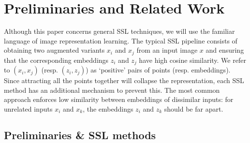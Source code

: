 
\section{Preliminaries and Related Work}


Although this paper concerns general SSL techniques, we will use the familiar language of image representation learning. The typical SSL pipeline consists of obtaining two augmented variants $x_i$ and $x_j$ from an input image $x$ and ensuring that the corresponding embeddings $z_i$ and $z_j$ have high cosine similarity. We refer to $(x_i, x_j)$ (resp. $(z_i, z_j)$) as `positive' pairs of points (resp. embeddings). 
Since attracting all the points together will collapse the representation, each SSL method has an additional mechanism to prevent this. The most common approach enforces low similarity between embeddings of dissimilar inputs: for unrelated inputs $x_i$ and $x_k$, the embeddings $z_i$ and $z_k$ should be far apart.

\subsection{Preliminaries \& SSL methods}

